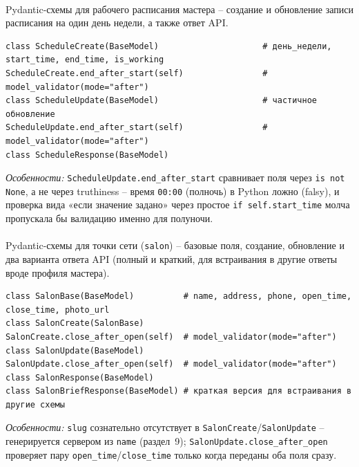\paragraph{}
Pydantic-схемы для рабочего расписания мастера -- создание и обновление
записи расписания на один день недели, а также ответ API.
\begin{verbatim}
class ScheduleCreate(BaseModel)                     # день_недели, start_time, end_time, is_working
ScheduleCreate.end_after_start(self)                # model_validator(mode="after")
class ScheduleUpdate(BaseModel)                     # частичное обновление
ScheduleUpdate.end_after_start(self)                # model_validator(mode="after")
class ScheduleResponse(BaseModel)
\end{verbatim}
\textit{Особенности:} \texttt{ScheduleUpdate.end_after_start} сравнивает
поля через \texttt{is not None}, а не через truthiness -- время
\texttt{00:00} (полночь) в Python ложно (falsy), и проверка вида «если
значение задано» через простое \texttt{if self.start_time} молча
пропускала бы валидацию именно для полуночи.

\paragraph{}
Pydantic-схемы для точки сети (\texttt{salon}) -- базовые поля, создание,
обновление и два варианта ответа API (полный и краткий, для встраивания в
другие ответы вроде профиля мастера).
\begin{verbatim}
class SalonBase(BaseModel)          # name, address, phone, open_time, close_time, photo_url
class SalonCreate(SalonBase)
SalonCreate.close_after_open(self)  # model_validator(mode="after")
class SalonUpdate(BaseModel)
SalonUpdate.close_after_open(self)  # model_validator(mode="after")
class SalonResponse(BaseModel)
class SalonBriefResponse(BaseModel) # краткая версия для встраивания в другие схемы
\end{verbatim}
\textit{Особенности:} \texttt{slug} сознательно отсутствует в
\texttt{SalonCreate}/\texttt{SalonUpdate} -- генерируется сервером из
\texttt{name} (раздел~9); \texttt{SalonUpdate.close_after_open}
проверяет пару \texttt{open_time}/\texttt{close_time} только когда
переданы оба поля сразу.

